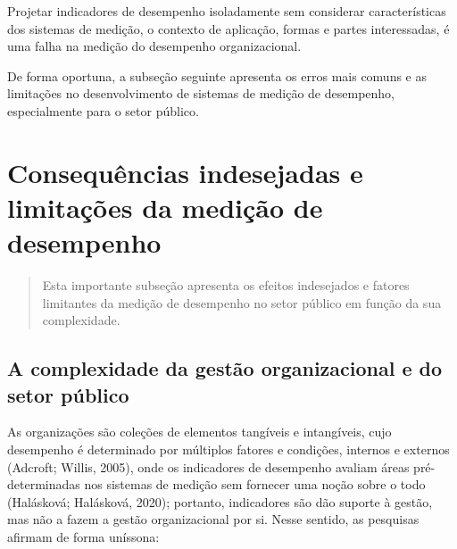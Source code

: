 \documentclass[
  letterpaper,
  DIV=11,
  numbers=noendperiod]{scrreprt}
\begin{document}
\begin{tcolorbox}[enhanced jigsaw, title=\textcolor{quarto-callout-warning-color}{\faExclamationTriangle}\hspace{0.5em}{Alerta!}, bottomrule=.15mm, arc=.35mm, bottomtitle=1mm, toprule=.15mm, coltitle=black, opacityback=0, colback=white, rightrule=.15mm, breakable, toptitle=1mm, leftrule=.75mm, titlerule=0mm, opacitybacktitle=0.6, colbacktitle=quarto-callout-warning-color!10!white, left=2mm, colframe=quarto-callout-warning-color-frame]

Projetar indicadores de desempenho isoladamente sem considerar
características dos sistemas de medição, o contexto de aplicação, formas
e partes interessadas, é uma falha na medição do desempenho
organizacional.

\end{tcolorbox}

De forma oportuna, a subseção seguinte apresenta os erros mais comuns e
as limitações no desenvolvimento de sistemas de medição de desempenho,
especialmente para o setor público.

\hypertarget{consequuxeancias-indesejadas-e-limitauxe7uxf5es-da-mediuxe7uxe3o-de-desempenho}{%
\chapter{Consequências indesejadas e limitações da medição de
desempenho}\label{consequuxeancias-indesejadas-e-limitauxe7uxf5es-da-mediuxe7uxe3o-de-desempenho}}

\begin{quote}
Esta importante subseção apresenta os efeitos indesejados e fatores
limitantes da medição de desempenho no setor público em função da sua
complexidade.
\end{quote}

\hypertarget{a-complexidade-da-gestuxe3o-organizacional-e-do-setor-puxfablico}{%
\section{A complexidade da gestão organizacional e do setor
público}\label{a-complexidade-da-gestuxe3o-organizacional-e-do-setor-puxfablico}}

As organizações são coleções de elementos tangíveis e intangíveis, cujo
desempenho é determinado por múltiplos fatores e condições, internos e
externos (Adcroft; Willis, 2005), onde os indicadores de desempenho
avaliam áreas pré-determinadas nos sistemas de medição sem fornecer uma
noção sobre o todo (Halásková; Halásková, 2020); portanto, indicadores
são dão suporte à gestão, mas não a fazem a gestão organizacional por
si. Nesse sentido, as pesquisas afirmam de forma uníssona:
\end{document}
